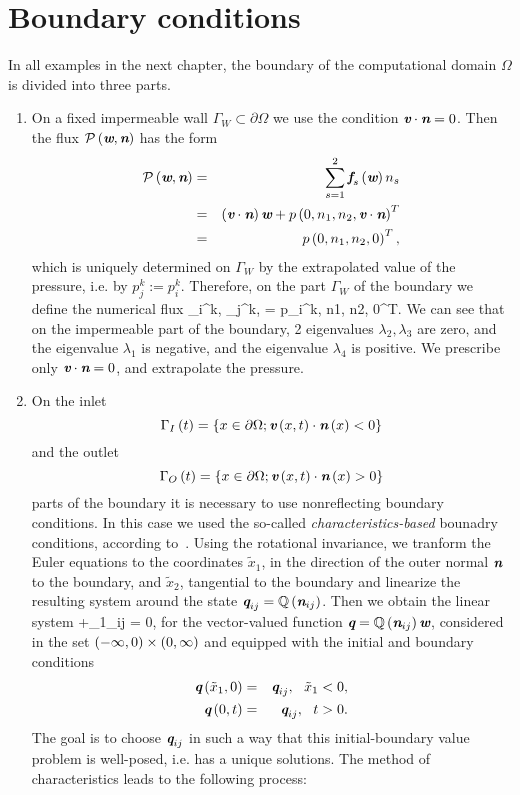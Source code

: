 \section{Boundary conditions}
In all examples in the next chapter, the boundary of the computational domain $\Omega$ is divided into three parts.
\begin{enumerate}
\item On a fixed impermeable wall $\Gamma_W\subset\partial\Omega$ we use the condition $\textit{\textbf{v}}\cdot\textit{\textbf{n}} = 0$. Then the flux $\mathcal{P}\left(\textit{\textbf{w}},\textit{\textbf{n}}\right)$ has the form
\begin{eqnarray}
\mathcal{P}\left(\textit{\textbf{w}},\textit{\textbf{n}}\right) & = & \sum_{s=1}^2\textit{\textbf{f}}_s\left(\textit{\textbf{w}}\right) n_s \\ & = & \left(\textit{\textbf{v}}\cdot\textit{\textbf{n}}\right)\textit{\textbf{w}} + p \left( 0, n_1, n_2, \textit{\textbf{v}}\cdot\textit{\textbf{n}}\right)^T \\ & = & p\left( 0, n_1, n_2, 0\right)^T,
\end{eqnarray}
which is uniquely determined on $\Gamma_W$ by the extrapolated value of the pressure, i.e. by $p_j^k := p_i^k$. Therefore, on the part $\Gamma_W$ of the boundary we define the numerical flux
\be
{}\lo{}_i^k, _j^k, \ro = p_i^k, n1, n2, 0\ro^T.
\ee
We can see that on the impermeable part of the boundary, 2 eigenvalues $\lambda_2, \lambda_3$ are zero, and the eigenvalue $\lambda_1$ is negative, and the eigenvalue $\lambda_4$ is positive. We prescribe only $\textit{\textbf{v}}\cdot\textit{\textbf{n}} = 0$, and extrapolate the pressure.
\item
On the inlet
$$
\Gamma_I\left( t \right) = \left\{x\in\partial\Omega; \textit{\textbf{v}}\left( x, t\right) \cdot \textit{\textbf{n}}\left( x \right) < 0\right\}
$$
and the outlet
$$
\Gamma_O\left( t \right) = \left\{x\in\partial\Omega; \textit{\textbf{v}}\left( x, t\right) \cdot \textit{\textbf{n}}\left( x \right) > 0\right\}
$$
parts of the boundary it is necessary to use nonreflecting boundary conditions. In this case we used the so-called \emph{characteristics-based} bounadry conditions, according to~\cite{sbornik konference HYP06}.
Using the rotational invariance, we tranform the Euler equations to the coordinates $\tilde{x}_1$, in the direction of the outer normal $\textit{\textbf{n}}$ to the boundary, and $\tilde{x}_2$, tangential to the boundary and linearize the resulting system around the state $\textit{\textbf{q}}_{ij} = \mathbb{Q}\left(\textit{\textbf{n}}_{ij}\right)$. Then we obtain the linear system
\be
{} +_1\lo{}_{ij}\ro{} = 0,
\ee
for the vector-valued function $\textit{\textbf{q}} = \mathbb{Q}\left(\textit{\textbf{n}}_{ij}\right)\textit{\textbf{w}}$, considered in the set $\left( -\infty,0\right)\times\left( 0,\infty\right)$ and equipped with the initial and boundary conditions
\begin{eqnarray}
\textit{\textbf{q}}\left(\tilde{x}_1,0\right) & = & \textit{\textbf{q}}_{ij},\ \ \tilde{x}_1 < 0,\\
\textit{\textbf{q}}\left( 0,t\right) & = & \textit{\textbf{q}}_{ij},\ \ t > 0.
\end{eqnarray}
The goal is to choose $\textit{\textbf{q}}_{ij}$ in such a way that this initial-boundary value problem is well-posed, i.e. has a unique solutions. The method of characteristics leads to the following process:

\end{enumerate}
